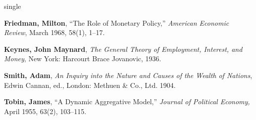 \documentclass[12pt]{uthesis-v12}  %
\begin{document}

\myreferences

 \hfill {}      %

\begin{referencelist}{single}
\item \textbf{Friedman, Milton}, ``The Role of Monetary Policy,''
      \emph{American Economic Review}, March 1968, 58(1), 1--17.

\item \textbf{Keynes, John Maynard}, \emph{The General Theory of
      Employment, Interest, and Money}, New York: Harcourt Brace
      Jovanovic, 1936.

\item \textbf{Smith, Adam}, \emph{An Inquiry into the Nature and
      Causes of the Wealth of Nations}, Edwin Cannan, ed.,
      London: Methuen \& Co., Ltd. 1904.

\item \textbf{Tobin, James}, ``A Dynamic Aggregative Model,''
      \emph{Journal of Political Economy,} April 1955, 63(2),
      103--115.
\end{referencelist}

 \hfill {}      %
\end{document}
